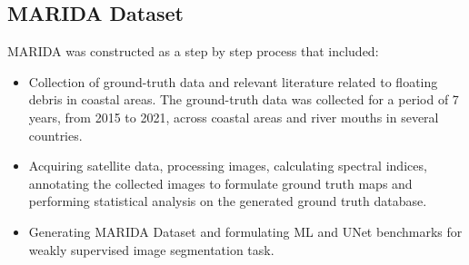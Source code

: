 \documentclass[review]{elsarticle}
\begin{document}
\subsection{MARIDA Dataset}
MARIDA was constructed as a step by step process that included:
\begin{itemize}
    \item Collection of ground-truth data and relevant literature related to floating debris in coastal areas. The ground-truth data was collected for a period of 7 years, from 2015 to 2021, across coastal areas and river mouths in several countries.
    \item Acquiring satellite data, processing images, calculating spectral indices, annotating the collected images to formulate ground truth maps and performing statistical analysis on the generated ground truth database.
    \item Generating MARIDA Dataset and formulating ML and UNet benchmarks for weakly supervised image segmentation task.
\end{itemize}
\end{document}

